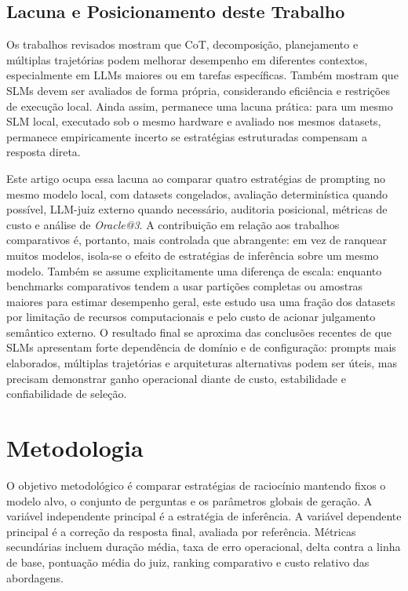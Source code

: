 \documentclass[12pt]{article}
\makeatletter
\newcommand{\oracle}{\mbox{\textit{Oracle@3}}}
\makeatother
\begin{document}
\subsection{Lacuna e Posicionamento deste Trabalho}

Os trabalhos revisados mostram que CoT, decomposição, planejamento e múltiplas trajetórias podem melhorar desempenho em diferentes contextos, especialmente em LLMs maiores ou em tarefas específicas. Também mostram que SLMs devem ser avaliados de forma própria, considerando eficiência e restrições de execução local. Ainda assim, permanece uma lacuna prática: para um mesmo SLM local, executado sob o mesmo hardware e avaliado nos mesmos datasets, permanece empiricamente incerto se estratégias estruturadas compensam a resposta direta.

Este artigo ocupa essa lacuna ao comparar quatro estratégias de prompting no mesmo modelo local, com datasets congelados, avaliação determinística quando possível, LLM-juiz externo quando necessário, auditoria posicional, métricas de custo e análise de \oracle{}. A contribuição em relação aos trabalhos comparativos é, portanto, mais controlada que abrangente: em vez de ranquear muitos modelos, isola-se o efeito de estratégias de inferência sobre um mesmo modelo. Também se assume explicitamente uma diferença de escala: enquanto benchmarks comparativos tendem a usar partições completas ou amostras maiores para estimar desempenho geral, este estudo usa uma fração dos datasets por limitação de recursos computacionais e pelo custo de acionar julgamento semântico externo. O resultado final se aproxima das conclusões recentes de que SLMs apresentam forte dependência de domínio e de configuração: prompts mais elaborados, múltiplas trajetórias e arquiteturas alternativas podem ser úteis, mas precisam demonstrar ganho operacional diante de custo, estabilidade e confiabilidade de seleção.



\section{Metodologia}

O objetivo metodológico é comparar estratégias de raciocínio mantendo fixos o modelo alvo, o conjunto de perguntas e os parâmetros globais de geração. A variável independente principal é a estratégia de inferência. A variável dependente principal é a correção da resposta final, avaliada por referência. Métricas secundárias incluem duração média, taxa de erro operacional, delta contra a linha de base, pontuação média do juiz, ranking comparativo e custo relativo das abordagens.
\end{document}
